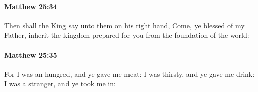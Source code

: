 		\paragraph{Matthew 25:34} %
			\label{MATTHEW-25-34}

			Then shall the King say unto them on his right hand, Come, ye blessed of my Father, inherit the kingdom prepared for you from the foundation of the world:

			\begin{framed}
			\scriptsize
				\begin{compactdesc}
					\item[SBLG] 
				\end{compactdesc}
			\end{framed}

		\paragraph{Matthew 25:35} %
			\label{MATTHEW-25-35}

			For I was an hungred, and ye gave me meat: I was thirsty, and ye gave me drink: I was a stranger, and ye took me in:

